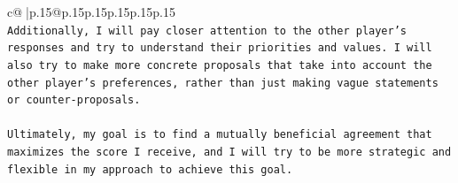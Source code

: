 \documentclass{article}
\begin{document}
{\begin{supertabular}{c@{$\;$}|p{.15\linewidth}@{}p{.15\linewidth}p{.15\linewidth}p{.15\linewidth}p{.15\linewidth}p{.15\linewidth}}
{{{\\ 
\texttt{Additionally, I will pay closer attention to the other player's responses and try to understand their priorities and values. I will also try to make more concrete proposals that take into account the other player's preferences, rather than just making vague statements or counter{-}proposals.} \\
\\ 
\texttt{Ultimately, my goal is to find a mutually beneficial agreement that maximizes the score I receive, and I will try to be more strategic and flexible in my approach to achieve this goal.} \\
            }
        }
    }
     \\ \\

\end{supertabular}
}
\end{document}
